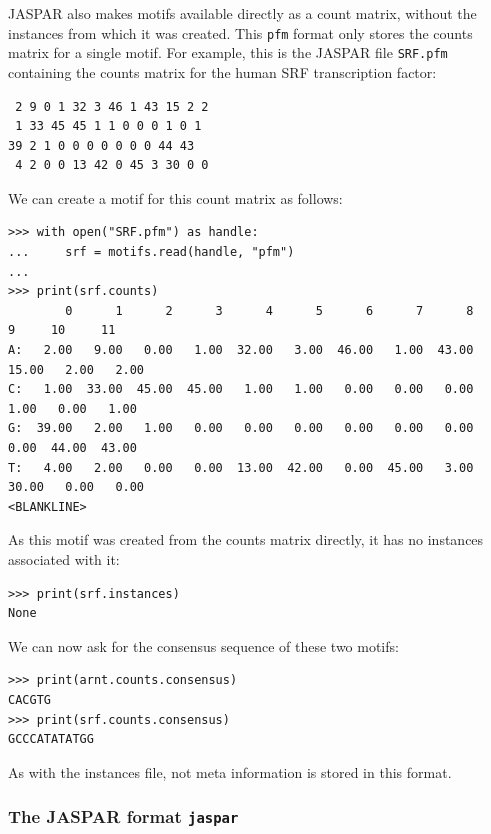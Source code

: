 \documentclass{report}
\begin{document}
JASPAR also makes motifs available directly as a count matrix,
without the instances from which it was created. This \verb+pfm+ format only
stores the counts matrix for a single motif.
For example, this is the JASPAR file \verb+SRF.pfm+ containing the counts matrix for the human SRF transcription factor:
\begin{verbatim}
 2 9 0 1 32 3 46 1 43 15 2 2
 1 33 45 45 1 1 0 0 0 1 0 1
39 2 1 0 0 0 0 0 0 0 44 43
 4 2 0 0 13 42 0 45 3 30 0 0
\end{verbatim}
We can create a motif for this count matrix as follows:
\begin{verbatim}
>>> with open("SRF.pfm") as handle:
...     srf = motifs.read(handle, "pfm")
...
>>> print(srf.counts)
        0      1      2      3      4      5      6      7      8      9     10     11
A:   2.00   9.00   0.00   1.00  32.00   3.00  46.00   1.00  43.00  15.00   2.00   2.00
C:   1.00  33.00  45.00  45.00   1.00   1.00   0.00   0.00   0.00   1.00   0.00   1.00
G:  39.00   2.00   1.00   0.00   0.00   0.00   0.00   0.00   0.00   0.00  44.00  43.00
T:   4.00   2.00   0.00   0.00  13.00  42.00   0.00  45.00   3.00  30.00   0.00   0.00
<BLANKLINE>
\end{verbatim}
As this motif was created from the counts matrix directly, it has no instances associated with it:
\begin{verbatim}
>>> print(srf.instances)
None
\end{verbatim}
We can now ask for the consensus sequence of these two motifs:
\begin{verbatim}
>>> print(arnt.counts.consensus)
CACGTG
>>> print(srf.counts.consensus)
GCCCATATATGG
\end{verbatim}

As with the instances file, not meta information is stored in this format.

\subsubsection*{The JASPAR format \texttt{jaspar}}
\end{document}
